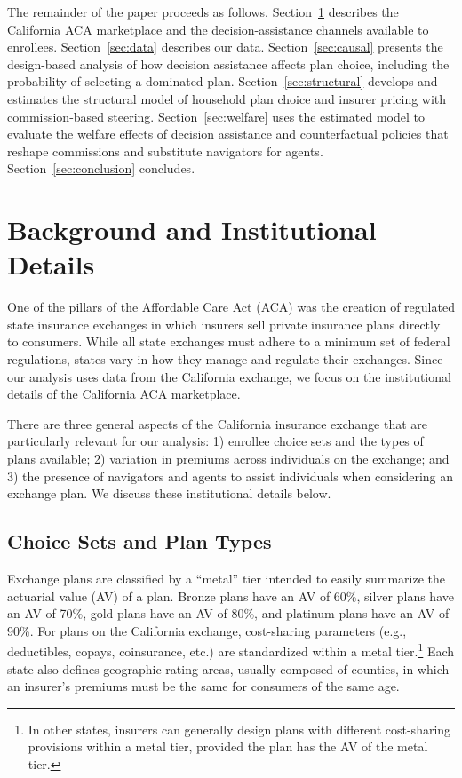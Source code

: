 \documentclass[12pt]{article}
\begin{document}
The remainder of the paper proceeds as follows. Section~\ref{sec:background} describes the California ACA marketplace and the decision-assistance channels available to enrollees. Section~\ref{sec:data} describes our data. Section~\ref{sec:causal} presents the design-based analysis of how decision assistance affects plan choice, including the probability of selecting a dominated plan. Section~\ref{sec:structural} develops and estimates the structural model of household plan choice and insurer pricing with commission-based steering. Section~\ref{sec:welfare} uses the estimated model to evaluate the welfare effects of decision assistance and counterfactual policies that reshape commissions and substitute navigators for agents. Section~\ref{sec:conclusion} concludes.

\section{Background and Institutional Details}
\label{sec:background}

One of the pillars of the Affordable Care Act (ACA) was the creation of regulated state insurance exchanges in which insurers sell private insurance plans directly to consumers. While all state exchanges must adhere to a minimum set of federal regulations, states vary in how they manage and regulate their exchanges. Since our analysis uses data from the California exchange, we focus on the institutional details of the California ACA marketplace.

There are three general aspects of the California insurance exchange that are particularly relevant for our analysis: 1) enrollee choice sets and the types of plans available; 2) variation in premiums across individuals on the exchange; and 3) the presence of navigators and agents to assist individuals when considering an exchange plan. We discuss these institutional details below.

\subsection{Choice Sets and Plan Types}
Exchange plans are classified by a ``metal'' tier intended to easily summarize the actuarial value (AV) of a plan. Bronze plans have an AV of 60\%, silver plans have an AV of 70\%, gold plans have an AV of 80\%, and platinum plans have an AV of 90\%. For plans on the California exchange, cost-sharing parameters (e.g., deductibles, copays, coinsurance, etc.) are standardized within a metal tier.\footnote{In other states, insurers can generally design plans with different cost-sharing provisions within a metal tier, provided the plan has the AV of the metal tier.} Each state also defines geographic rating areas, usually composed of counties, in which an insurer's premiums must be the same for consumers of the same age.
\end{document}
